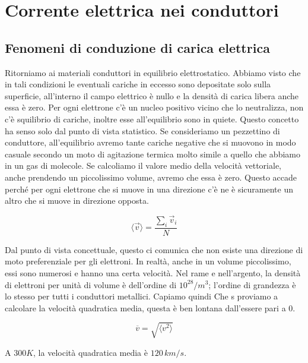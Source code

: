 \chapter{Corrente elettrica nei conduttori}

\section{Fenomeni di conduzione di carica elettrica}

Ritorniamo ai materiali conduttori in equilibrio elettrostatico. Abbiamo visto che in tali condizioni le eventuali cariche in eccesso sono depositate solo sulla superficie, all'interno il campo elettrico è nullo e la densità di carica libera anche essa è zero. Per ogni elettrone c'è un nucleo positivo vicino che lo neutralizza, non c'è squilibrio di cariche, inoltre esse all'equilibrio sono in quiete. Questo concetto ha senso solo dal punto di vista statistico. Se consideriamo un pezzettino di conduttore, all'equilibrio avremo tante cariche negative che si muovono in modo casuale secondo un moto di agitazione termica molto simile a quello che abbiamo in un gas di molecole. Se calcoliamo il valore medio della velocità vettoriale, anche prendendo un piccolissimo volume, avremo che essa è zero. Questo accade perché per ogni elettrone che si muove in una direzione c'è ne è sicuramente un altro che si muove in direzione opposta.

\[
	\langle \vec{v} \rangle = \frac{\sum_i \vec{v}_i}{N}
\]

Dal punto di vista concettuale, questo ci comunica che non esiste una direzione di moto preferenziale per gli elettroni. In realtà, anche in un volume piccolissimo, essi sono numerosi e hanno una certa velocità. Nel rame e nell'argento, la densità di elettroni per unità di volume è dell'ordine di $10^{28}/m^3$; l'ordine di grandezza è lo stesso per tutti i conduttori metallici. Capiamo quindi Che s proviamo a calcolare la velocità quadratica media, questa è ben lontana dall'essere pari a $0$.

\[
	\overline{v} = \sqrt{\langle v^2 \rangle}
\]

A $300 K$, la velocità quadratica media è $120\,km/s$.

